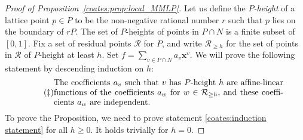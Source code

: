 \documentclass[11pt]{article}
\numberwithin{equation}{section}
\begin{document}
\begin{proof}[Proof of Proposition~\ref{coates:prop:local_MMLP}]
Let us define the \emph{$P$-height} of a lattice point $p \in P$ to be the non-negative rational number $r$ such that $p$ lies on the boundary of $rP$. The set of $P$-heights of points in $P \cap N$ is a finite subset of $[0,1]$. Fix a set of residual points $\mathcal{R}$ for $P$, and write $\mathcal{R}_{\geq h}$ for the set of points in $\mathcal{R}$ of $P$-height at least $h$. Set $f = \sum_{v \in P \cap N} a_v \bm{x}^v$. We will prove the following statement by descending induction on $h$:
  \begin{equation}
  \tag{$\ddagger$}
  \label{coates:induction statement}
  \begin{minipage}{0.8\textwidth}
    The coefficients $a_v$ such that $v$ has $P$-height $h$ are affine-linear functions of the coefficients $a_w$ for $w \in \mathcal{R}_{\geq h}$, and these coefficients $a_w$ are independent.
  \end{minipage}
  \end{equation}
  \noindent To prove the Proposition, we need to prove statement \eqref{coates:induction statement} for all $h \geq 0$. It holds trivially for $h=0$.


\end{proof}
\end{document}
